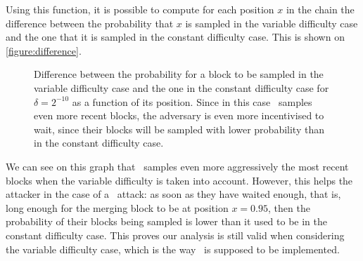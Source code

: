 Using this function, it is possible to compute for each position \(x\) in the chain the difference between the probability that \(x\) is sampled in the variable difficulty case and the one that it is sampled in the constant difficulty case. This is shown on \autoref{figure:difference}.

\begin{figure}[ht]
  \centering
  \caption{Difference between the probability for a block to be sampled in the variable difficulty case and the one in the constant difficulty case for \(\delta=2^{-10}\) as a function of its position. Since in this case \FC\ samples even more recent blocks, the adversary is even more incentivised to wait, since their blocks will be sampled with lower probability than in the constant difficulty case.}
  \label{figure:difference}
\end{figure}

We can see on this graph that \FC\ samples even more aggressively the most recent blocks when the variable difficulty is taken into account. However, this helps the attacker in the case of a \cs\ attack: as soon as they have waited enough, that is, long enough for the merging block to be at position \(x=\num{0.95}\), then the probability of their blocks being sampled is lower than it used to be in the constant difficulty case. This proves our analysis is still valid when considering the variable difficulty case, which is the way \FC\ is supposed to be implemented.